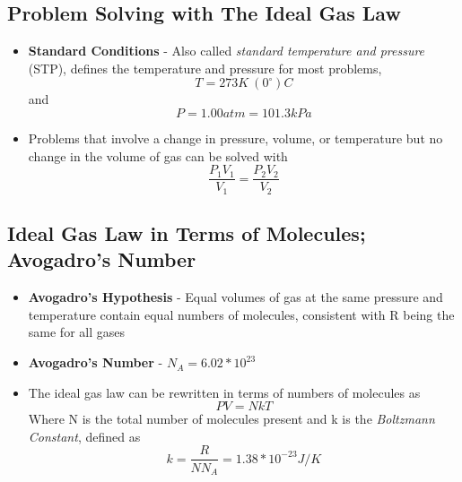 \subsection{Problem Solving with The Ideal Gas Law}
\begin{itemize}
    \item \textbf{Standard Conditions} - Also called \emph{standard temperature and pressure} (STP), defines the temperature and pressure for most problems, \[T=273K\ (0^\circ)C\] and \[P=1.00atm=101.3kPa\]
    \item Problems that involve a change in pressure, volume, or temperature but no change in the volume of gas can be solved with \[\frac{P_1V_1}{V_1}=\frac{P_2V_2}{V_2}\]
\end{itemize}

\subsection{Ideal Gas Law in Terms of Molecules; Avogadro's Number}
\begin{itemize}
    \item \textbf{Avogadro's Hypothesis} - Equal volumes of gas at the same pressure and temperature contain equal numbers of molecules, consistent with R being the same for all gases
    \item \textbf{Avogadro's Number} - \(N_A=6.02*10^{23}\)
    \item The ideal gas law can be rewritten in terms of numbers of molecules as \[PV=NkT\] Where N is the total number of molecules present and k is the \emph{Boltzmann Constant}, defined as \[k=\frac{R}{NN_A}=1.38*10^{-23}J/K\]
\end{itemize}

